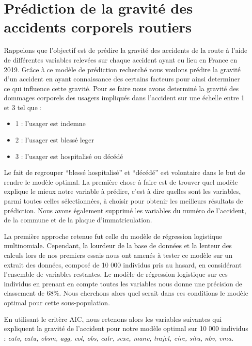 \documentclass[french,]{tp}
\providecommand{\tightlist}{%
  \setlength{\itemsep}{0pt}\setlength{\parskip}{0pt}}
\begin{document}
\hypertarget{pruxe9diction-de-la-gravituxe9-des-accidents-corporels-routiers}{%
\section{Prédiction de la gravité des accidents corporels routiers}\label{pruxe9diction-de-la-gravituxe9-des-accidents-corporels-routiers}}

Rappelons que l'objectif est de prédire la gravité des accidents de la route à l'aide de différentes variables relevées sur chaque accident ayant eu lieu en France en 2019. Grâce à ce modèle de prédiction recherché nous voulons prédire la gravité d'un accident en ayant connaissance des certains facteurs pour ainsi determiner ce qui influence cette gravité. Pour se faire nous avons determiné la gravité des dommages corporels des usagers impliqués dans l'accident sur une échelle entre 1 et 3 tel que :

\begin{itemize}
\tightlist
\item
  1 : l'usager est indemne\\
\item
  2 : l'usager est blessé leger\\
\item
  3 : l'usager est hospitalisé ou décédé
\end{itemize}

Le fait de regrouper ``blessé hospitalisé'' et ``décédé'' est volontaire dans le but de rendre le modèle optimal. La première chose à faire est de trouver quel modèle explique le mieux notre variable à prédire, c'est à dire quelles sont les variables, parmi toutes celles sélectionnées, à choisir pour obtenir les meilleurs résultats de prédiction.
Nous avons également supprimé les variables du numéro de l'accident, de la commune et de la plaque d'immatriculation.

La première approche retenue fut celle du modèle de régression logistique multinomiale. Cependant, la lourdeur de la base de données et la lenteur des calculs lors de nos premiers essais nous ont amenés à tester ce modèle sur un extrait des données, composé de 10 000 individus pris au hasard, en considérant l'ensemble de variables restantes. Le modèle de régression logistique sur ces individus en prenant en compte toutes les variables nous donne une précision de classement de 68\%.
Nous cherchons alors quel serait dans ces conditions le modèle optimal pour cette sous-population.

En utilisant le critère AIC, nous retenons alors les variables suivantes qui expliquent la gravité de l'accident pour notre modèle optimal sur 10 000 individus : \emph{catv, catu, obsm, agg, col, obs, catr, sexe, manv, trajet, circ, situ, nbv, vma}.
\end{document}
